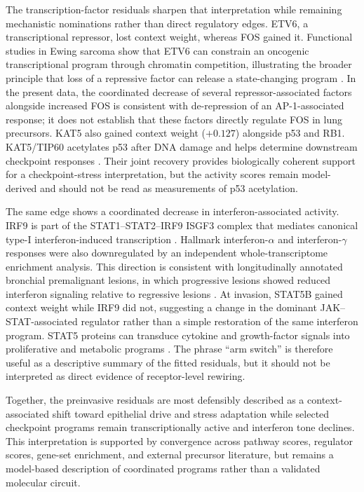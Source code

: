 The transcription-factor residuals sharpen that interpretation while remaining mechanistic nominations rather than direct regulatory edges. ETV6, a transcriptional repressor, lost context weight, whereas FOS gained it. Functional studies in Ewing sarcoma show that ETV6 can constrain an oncogenic transcriptional program through chromatin competition, illustrating the broader principle that loss of a repressive factor can release a state-changing program \autocite{Lu2023-yz}. In the present data, the coordinated decrease of several repressor-associated factors alongside increased FOS is consistent with de-repression of an AP-1-associated response; it does not establish that these factors directly regulate FOS in lung precursors. KAT5 also gained context weight ($+0.127$) alongside p53 and RB1. KAT5/TIP60 acetylates p53 after DNA damage and helps determine downstream checkpoint responses \autocite{Tang2006-ns}. Their joint recovery provides biologically coherent support for a checkpoint-stress interpretation, but the activity scores remain model-derived and should not be read as measurements of p53 acetylation.

The same edge shows a coordinated decrease in interferon-associated activity. IRF9 is part of the STAT1--STAT2--IRF9 ISGF3 complex that mediates canonical type-I interferon-induced transcription \autocite{Platanitis2019-av}. Hallmark interferon-$\alpha$ and interferon-$\gamma$ responses were also downregulated by an independent whole-transcriptome enrichment analysis. This direction is consistent with longitudinally annotated bronchial premalignant lesions, in which progressive lesions showed reduced interferon signaling relative to regressive lesions \autocite{Beane2019-mp}. At invasion, STAT5B gained context weight while IRF9 did not, suggesting a change in the dominant JAK--STAT-associated regulator rather than a simple restoration of the same interferon program. STAT5 proteins can transduce cytokine and growth-factor signals into proliferative and metabolic programs \autocite{Li2023-tt}. The phrase ``arm switch'' is therefore useful as a descriptive summary of the fitted residuals, but it should not be interpreted as direct evidence of receptor-level rewiring.

Together, the preinvasive residuals are most defensibly described as a context-associated shift toward epithelial drive and stress adaptation while selected checkpoint programs remain transcriptionally active and interferon tone declines. This interpretation is supported by convergence across pathway scores, regulator scores, gene-set enrichment, and external precursor literature, but remains a model-based description of coordinated programs rather than a validated molecular circuit.

